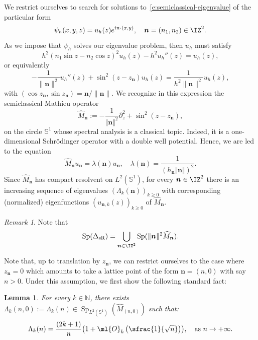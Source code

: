 \documentclass[10pt]{amsart}
\theoremstyle{plain}
\newtheorem{lemm}[theo]{Lemma}
\theoremstyle{definition}
\theoremstyle{remark}
\newtheorem{rema}[theo]{Remark}
\begin{document}
We restrict ourselves to search for solutions to~\eqref{e:semiclassical-eigenvalue} of the particular form
\[
\psi_h(x,y,z)=u_h(z)e^{in \cdot (x,y)},\quad \boldsymbol{n}=(n_1,n_2)\in\IZ^2.
\]
As we impose that $\psi_h$ solves our eigenvalue problem, then $u_h$ must satisfy
\[
h^2(n_1\sin z-n_2\cos z)^2u_h(z)-h^2u_h''(z)=u_h(z),
\]
or equivalently
\[
-\frac{1}{\|\boldsymbol{n}\|^2}u_h''(z)+\sin^2(z-z_{\boldsymbol{n}})u_h(z)=\frac{1}{h^2\|\boldsymbol{n}\|^2}u_h(z),
\]
with $(\cos z_{\boldsymbol{n}},\sin z_{\boldsymbol{n}})=\boldsymbol{n}/\|\boldsymbol{n}\|$. We recognize in this expression the semiclassical Mathieu operator
\[
\widehat{M}_{\boldsymbol{n}} := - \frac{1}{\Vert \boldsymbol{n} \Vert^2} \partial_z^2 + \sin^2(z- z_{\boldsymbol{n}}),
\]
on the circle $\mathbb{S}^1$ whose spectral analysis is a classical topic. Indeed, it is a one-dimensional Schrödinger operator with a double well potential. Hence, we are led to the equation
\begin{equation}
\label{e:Mathieu_equation}
\widehat{M}_{\boldsymbol{n}} u_{\boldsymbol{n}} = \lambda(\boldsymbol{n}) u_{\boldsymbol{n}}, \quad \lambda(\boldsymbol{n}) = \frac{1}{(h_{\boldsymbol{n}} \Vert \boldsymbol{n} \Vert)^2}.
\end{equation}
Since $\widehat{M}_{\boldsymbol{n}}$ has compact resolvent on $L^2(\mathbb{S}^1)$, for every $\boldsymbol{n}\in\IZ^2$ there is an increasing sequence of eigenvalues $(\Lambda_k(\boldsymbol{n}))_{k\geq 0}$ with corresponding (normalized) eigenfunctions $(u_{\boldsymbol{n},k}(z))_{k\geq 0}$ of $\widehat{M}_{\boldsymbol{n}}$.
\begin{rema} Note that
\[
\operatorname{Sp}(\Delta_{\text{sR}})=\bigcup_{\boldsymbol{n}\in\IZ^2}\operatorname{Sp}(\|\boldsymbol{n}\|^2\widehat{M}_{\boldsymbol{n}}).
\]
\end{rema}

Note that, up to translation by $z_{\boldsymbol{n}}$, we can restrict ourselves to the case where $z_{\boldsymbol{n}}=0$ which amounts to take a lattice point of the form $\boldsymbol{n}=(n,0)$ with say $n>0$. Under this assumption, we first show the following standard fact:

\begin{lemm}
\label{l:quasimodes_for_mathieu}
For every $k \in \mathbb{N}$, there exists $\Lambda_k(n,0):=\Lambda_k(n) \in \operatorname{Sp}_{L^2(\mathbb{S}^1)}(\widehat{M}_{(n,0)})$ such that:
\begin{equation}
\label{e:eigenvalues_asymptic}
\Lambda_k(n) = \frac{(2k+1)}{ n } \bigl(1 + \ml{O}_k\left(\sfrac{1}{\sqrt{n}}\right) \bigr), \quad \text{as } n \to + \infty.
\end{equation}
\end{lemm}
\end{document}
